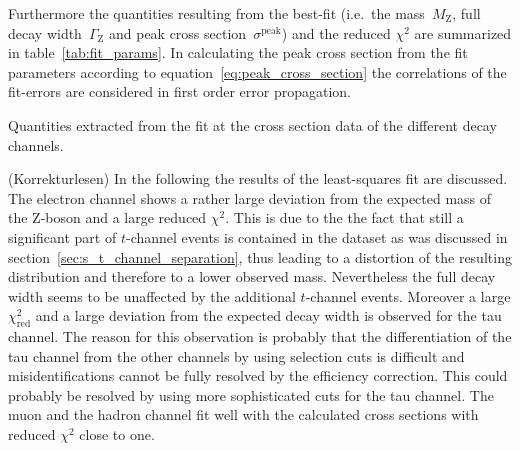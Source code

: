 \documentclass[11pt, a4paper]{article}
\numberwithin{equation}{section}
\newcommand{\korr}[1]{{\color{red}(#1)}}
\begin{document}
Furthermore the quantities resulting from the best-fit (i.e.\ the mass~$M_\mathrm{Z}$, full decay width~$\Gamma_\mathrm{Z}$ and peak cross section~$\sigma^\mathrm{peak}$) and the reduced $\chi^2$ are summarized in table~\ref{tab:fit_params}.
In calculating the peak cross section from the fit parameters according to equation~\eqref{eq:peak_cross_section} the correlations of the fit-errors are considered in first order error propagation.
\begin{table}[h]
	\centering
	
	\caption{Quantities extracted from the fit at the cross section data of the different decay channels.}
	\label{tab:fit_params}
\end{table}

\korr{Korrekturlesen}
In the following the results of the least-squares fit are discussed.
The electron channel shows a rather large deviation from the expected mass of the Z-boson and a large reduced $\chi^2$.
This is due to the the fact that still a significant part of $t$-channel events is contained in the dataset as was discussed in section~\ref{sec:s_t_channel_separation}, thus leading to a distortion of the resulting distribution and therefore to a lower observed mass.
Nevertheless the full decay width seems to be unaffected by the additional $t$-channel events.
Moreover a large $\chi_\mathrm{red}^2$ and a large deviation from the expected decay width is observed for the tau channel.
The reason for this observation is probably that the differentiation of the tau channel from the other channels by using selection cuts is difficult and misidentifications cannot be fully resolved by the efficiency correction.
This could probably be resolved by using more sophisticated cuts for the tau channel.
The muon and the hadron channel fit well with the calculated cross sections with reduced $\chi^2$ close to one.
\end{document}
